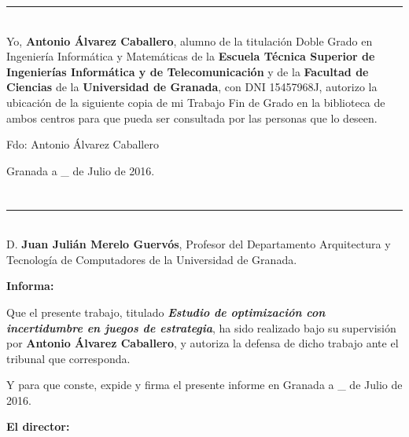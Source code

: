 \noindent\rule[-1ex]{\textwidth}{2pt}\\[4.5ex]

Yo, \textbf{Antonio Álvarez Caballero}, alumno de la titulación Doble Grado en
Ingeniería Informática y Matemáticas de la \textbf{Escuela Técnica Superior
de Ingenierías Informática y de Telecomunicación} y de la \textbf{Facultad de Ciencias}
de la \textbf{Universidad de Granada}, con DNI 15457968J, autorizo la
ubicación de la siguiente copia de mi Trabajo Fin de Grado en la biblioteca de
ambos centros para que pueda ser consultada por las personas que lo deseen.

\vspace{6cm}

\noindent Fdo: Antonio Álvarez Caballero

\vspace{2cm}

\begin{flushright}
Granada a \_ de Julio de 2016.
\end{flushright}


\chapter*{}
\thispagestyle{empty}

\noindent\rule[-1ex]{\textwidth}{2pt}\\[4.5ex]

D. \textbf{Juan Julián Merelo Guervós}, Profesor del Departamento Arquitectura y Tecnología de Computadores de la Universidad de Granada.

\vspace{0.5cm}

\textbf{Informa:}

\vspace{0.5cm}

Que el presente trabajo, titulado \textit{\textbf{Estudio de optimización con incertidumbre en juegos de estrategia}},
ha sido realizado bajo su supervisión por \textbf{Antonio Álvarez Caballero}, y autoriza la defensa de dicho trabajo ante el tribunal
que corresponda.

\vspace{0.5cm}

Y para que conste, expide y firma el presente informe en Granada a \_ de Julio de 2016.

\vspace{1cm}

\textbf{El director:}

\vspace{5cm}

